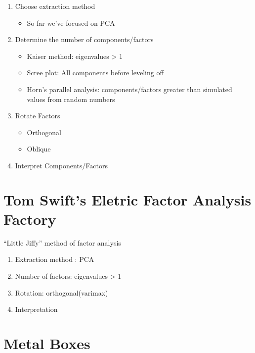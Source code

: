 \documentclass[
]{book}
\providecommand{\tightlist}{%
  \setlength{\itemsep}{0pt}\setlength{\parskip}{0pt}}
\begin{document}
\begin{enumerate}
\def\labelenumi{\arabic{enumi}.}
\tightlist
\item
  Choose extraction method

  \begin{itemize}
  \tightlist
  \item
    So far we've focused on PCA
  \end{itemize}
\item
  Determine the number of components/factors

  \begin{itemize}
  \tightlist
  \item
    Kaiser method: eigenvalues \textgreater{} 1
  \item
    Scree plot: All components before leveling off
  \item
    Horn's parallel analysis: components/factors greater than simulated values from random numbers
  \end{itemize}
\item
  Rotate Factors

  \begin{itemize}
  \tightlist
  \item
    Orthogonal
  \item
    Oblique
  \end{itemize}
\item
  Interpret Components/Factors
\end{enumerate}

\hypertarget{tom-swifts-eletric-factor-analysis-factory}{%
\section{Tom Swift's Eletric Factor Analysis Factory}\label{tom-swifts-eletric-factor-analysis-factory}}

``Little Jiffy'' method of factor analysis

\begin{enumerate}
\def\labelenumi{\arabic{enumi}.}
\tightlist
\item
  Extraction method : PCA
\item
  Number of factors: eigenvalues \textgreater{} 1
\item
  Rotation: orthogonal(varimax)
\item
  Interpretation
\end{enumerate}

\hypertarget{metal-boxes}{%
\section{Metal Boxes}\label{metal-boxes}}
\end{document}
